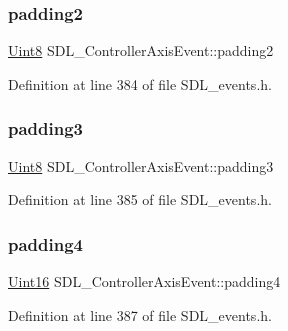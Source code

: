 \subsubsection{\texorpdfstring{padding2}{padding2}}
{\footnotesize\ttfamily \mbox{\hyperlink{_s_d_l__stdinc_8h_a2944638813a090aa23e62f4da842c3e2}{Uint8}} S\+D\+L\+\_\+\+Controller\+Axis\+Event\+::padding2}



Definition at line 384 of file S\+D\+L\+\_\+events.\+h.

\mbox{\label{struct_s_d_l___controller_axis_event_ab82598fe5621dca9b1a41f7b2ca1e9a0}} 
\subsubsection{\texorpdfstring{padding3}{padding3}}
{\footnotesize\ttfamily \mbox{\hyperlink{_s_d_l__stdinc_8h_a2944638813a090aa23e62f4da842c3e2}{Uint8}} S\+D\+L\+\_\+\+Controller\+Axis\+Event\+::padding3}



Definition at line 385 of file S\+D\+L\+\_\+events.\+h.

\mbox{\label{struct_s_d_l___controller_axis_event_ae0ad0f279b9978bbbac9f5b22ae8020b}} 
\subsubsection{\texorpdfstring{padding4}{padding4}}
{\footnotesize\ttfamily \mbox{\hyperlink{_s_d_l__stdinc_8h_a31fcc0a076c9068668173ee26d33e42b}{Uint16}} S\+D\+L\+\_\+\+Controller\+Axis\+Event\+::padding4}



Definition at line 387 of file S\+D\+L\+\_\+events.\+h.

\mbox{\label{struct_s_d_l___controller_axis_event_afc92dba0b4d1652a1ecf9e85606d1f14}} 
